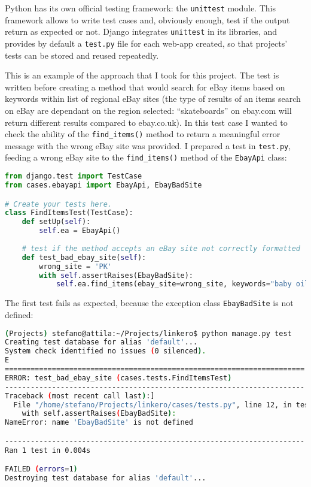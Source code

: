Python has its own official testing framework: the \texttt{unittest} module.
This framework allows to write test cases and, obviously enough, test if the output
return as expected or not. Django integrates \texttt{unittest} in its libraries,
and provides by default a \texttt{test.py} file for each web-app created, so
that projects' tests can be stored and reused repeatedly.

This is an example of the approach that I took for this project. The test
is written before creating a method that would search for eBay items based on
keywords within list of regional eBay sites (the type of results of an items
search on eBay are dependant on the region selected: ``skateboards'' on ebay.com
will return different results compared to ebay.co.uk). In this test case I
wanted to check the ability of the \texttt{find\_items()} method to return a
meaningful error message with the wrong eBay site was provided. I prepared a
test in \texttt{test.py}, feeding a wrong eBay site to the
\texttt{find\_items()} method of the \texttt{EbayApi} class:
\begin{lstlisting}[language=Python, breaklines=true]
from django.test import TestCase
from cases.ebayapi import EbayApi, EbayBadSite

# Create your tests here.
class FindItemsTest(TestCase):
    def setUp(self):
        self.ea = EbayApi()
    
    # test if the method accepts an eBay site not correctly formatted
    def test_bad_ebay_site(self):
        wrong_site = 'PK'
        with self.assertRaises(EbayBadSite):
            self.ea.find_items(ebay_site=wrong_site, keywords="baby oil")
\end{lstlisting}

The first test fails as expected, because the exception class
\texttt{EbayBadSite} is not defined:
\begin{lstlisting}[language=bash, breaklines=true]
(Projects) stefano@attila:~/Projects/linkero$ python manage.py test
Creating test database for alias 'default'...
System check identified no issues (0 silenced).
E
======================================================================
ERROR: test_bad_ebay_site (cases.tests.FindItemsTest)
----------------------------------------------------------------------
Traceback (most recent call last):]
  File "/home/stefano/Projects/linkero/cases/tests.py", line 12, in test_bad_ebay_site
    with self.assertRaises(EbayBadSite):
NameError: name 'EbayBadSite' is not defined

----------------------------------------------------------------------
Ran 1 test in 0.004s

FAILED (errors=1)
Destroying test database for alias 'default'...
\end{lstlisting}

